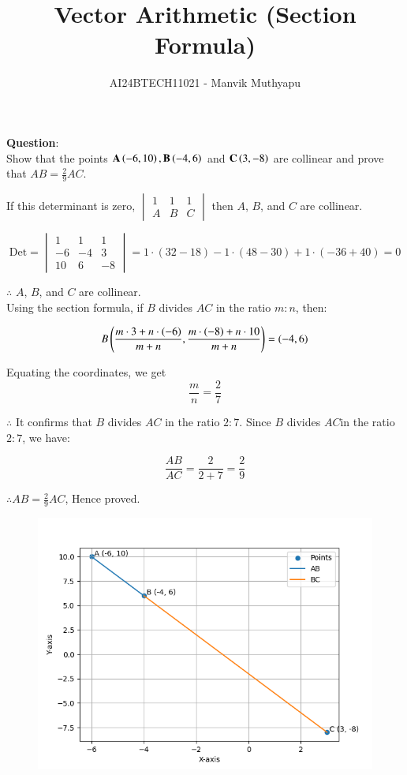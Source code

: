 \documentclass[journal,12pt,onecolumn]{IEEEtran}
\title{Vector Arithmetic (Section Formula)}
\author{AI24BTECH11021 - Manvik Muthyapu}
\theoremstyle{remark}
\begin{document}


\maketitle
\bigskip

\renewcommand{\thefigure}{\theenumi}
\renewcommand{\thetable}{\theenumi}


\textbf{Question}:\\

Show that the points $\textbf{A}\left(-6,10\right),\textbf{B}\left(-4,6\right)$ and $\textbf{C}\left(3,-8\right)$ are collinear and prove that $AB = \frac{2}{9}AC$.\\
		
\solution 

If this determinant is zero, 
$\begin{vmatrix}
1 & 1 & 1 \\
A & B & C
\end{vmatrix}
$
then $A$, $B$, and $C$ are collinear.

$$
\text{Det} =
\begin{vmatrix}
1 & 1 & 1 \\
-6 & -4 & 3 \\
10 & 6 & -8
\end{vmatrix}
= 1 \cdot (32 - 18) - 1 \cdot (48 - 30) + 1 \cdot (-36 + 40) = 0$$

$\therefore$ $A$, $B$, and $C$ are collinear.\\

Using the section formula, if $B$ divides $AC$ in the ratio $m:n$, then:

$$B\left(\frac{m \cdot 3 + n \cdot (-6)}{m+n}, \frac{m \cdot (-8) + n \cdot 10}{m+n}\right) = (-4, 6)$$

Equating the coordinates, we get 
$$\frac{m}{n} = \frac{2}{7}$$


$\therefore$ It confirms that $B$ divides $AC$ in the ratio $2:7$.
Since $B$ divides $AC$in the ratio $2:7$, we have:

$$\frac{AB}{AC} = \frac{2}{2+7} = \frac{2}{9}$$

$\therefore AB = \frac{2}{9} AC$, Hence proved.

\begin{figure}[h!]
	\centering
	\includegraphics[width=0.7\linewidth]{figs/fig1.png}
\end{figure}
\end{document}

